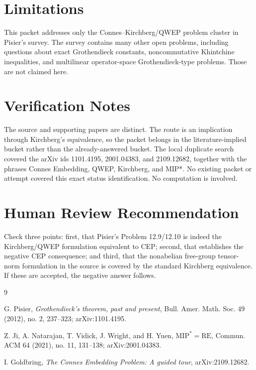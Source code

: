 \documentclass[11pt]{article}
\begin{document}
\section*{Limitations}

This packet addresses only the Connes--Kirchberg/QWEP problem cluster in
Pisier's survey. The survey contains many other open problems, including
questions about exact Grothendieck constants, noncommutative Khintchine
inequalities, and multilinear operator-space Grothendieck-type problems.
Those are not claimed here.

\section*{Verification Notes}

The source and supporting papers are distinct. The route is an implication
through Kirchberg's equivalence, so the packet belongs in the
literature-implied bucket rather than the already-answered bucket. The local
duplicate search covered the arXiv ids 1101.4195, 2001.04383, and
2109.12682, together with the phrases Connes Embedding, QWEP, Kirchberg, and
MIP*. No existing packet or attempt covered this exact status identification.
No computation is involved.

\section*{Human Review Recommendation}

Check three points: first, that Pisier's Problem 12.9/12.10 is indeed the
Kirchberg/QWEP formulation equivalent to CEP; second, that \cite{MIPRE}
establishes the negative CEP consequence; and third, that the nonabelian
free-group tensor-norm formulation in the source is covered by the standard
Kirchberg equivalence. If these are accepted, the negative answer follows.

\begin{thebibliography}{9}

G. Pisier,
\emph{Grothendieck's theorem, past and present},
Bull. Amer. Math. Soc. 49 (2012), no. 2, 237--323;
arXiv:1101.4195.

Z. Ji, A. Natarajan, T. Vidick, J. Wright, and H. Yuen,
\emph{\( \mathrm{MIP}^{*}=\mathrm{RE} \)},
Commun. ACM 64 (2021), no. 11, 131--138;
arXiv:2001.04383.

I. Goldbring,
\emph{The Connes Embedding Problem: A guided tour},
arXiv:2109.12682.

\end{thebibliography}
\end{document}
